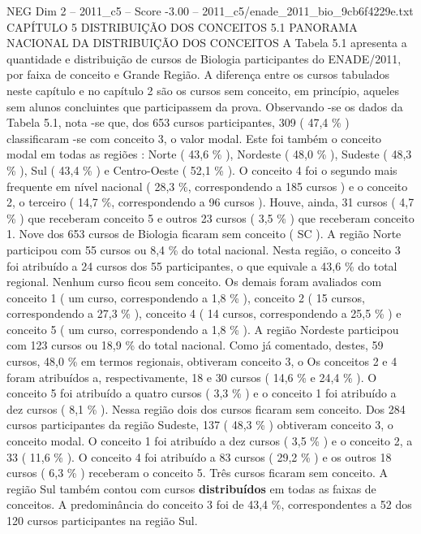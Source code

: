 \begin{textsample}{NEG Dim 2 – 2011\_c5 – Score -3.00 – 2011\_c5/enade\_2011\_bio\_9cb6f4229e.txt}  \label{ex:f2_neg_086}
CAPÍTULO 5 DISTRIBUIÇÃO DOS CONCEITOS 5.1 PANORAMA NACIONAL DA DISTRIBUIÇÃO DOS CONCEITOS A Tabela 5.1 apresenta a quantidade e distribuição de cursos de Biologia participantes do ENADE/2011, por faixa de conceito e Grande Região.
A diferença entre os cursos tabulados neste capítulo e no capítulo 2 são os cursos sem conceito, em princípio, aqueles sem alunos concluintes que participassem da prova.
Observando -se os dados da Tabela 5.1, nota -se que, dos 653 cursos participantes, 309 ( 47,4 \% ) classificaram -se com conceito 3, o valor modal.
Este foi também o conceito modal em todas as regiões : Norte ( 43,6 \% ), Nordeste ( 48,0 \% ), Sudeste ( 48,3 \% ), Sul ( 43,4 \% ) e Centro-Oeste ( 52,1 \% ).
O conceito 4 foi o segundo mais frequente em nível nacional ( 28,3 \%, correspondendo a 185 cursos ) e o conceito 2, o terceiro ( 14,7 \%, correspondendo a 96 cursos ).
Houve, ainda, 31 cursos ( 4,7 \% ) que receberam conceito 5 e outros 23 cursos ( 3,5 \% ) que receberam conceito 1.
Nove dos 653 cursos de Biologia ficaram sem conceito ( SC ).
A região Norte participou com 55 cursos ou 8,4 \% do total nacional.
Nesta região, o conceito 3 foi atribuído a 24 cursos dos 55 participantes, o que equivale a 43,6 \% do total regional.
Nenhum curso ficou sem conceito.
Os demais foram avaliados com conceito 1 ( um curso, correspondendo a 1,8 \% ), conceito 2 ( 15 cursos, correspondendo a 27,3 \% ), conceito 4 ( 14 cursos, correspondendo a 25,5 \% ) e conceito 5 ( um curso, correspondendo a 1,8 \% ).
A região Nordeste participou com 123 cursos ou 18,9 \% do total nacional.
Como já comentado, destes, 59 cursos, 48,0 \% em termos regionais, obtiveram conceito 3, o Os conceitos 2 e 4 foram atribuídos a, respectivamente, 18 e 30 cursos ( 14,6 \% e 24,4 \% ).
O conceito 5 foi atribuído a quatro cursos ( 3,3 \% ) e o conceito 1 foi atribuído a dez cursos ( 8,1 \% ).
Nessa região dois dos cursos ficaram sem conceito.
Dos 284 cursos participantes da região Sudeste, 137 ( 48,3 \% ) obtiveram conceito 3, o conceito modal.
O conceito 1 foi atribuído a dez cursos ( 3,5 \% ) e o conceito 2, a 33 ( 11,6 \% ).
O conceito 4 foi atribuído a 83 cursos ( 29,2 \% ) e os outros 18 cursos ( 6,3 \% ) receberam o conceito 5.
Três cursos ficaram sem conceito.
A região Sul também contou com cursos \textbf{distribuídos} em todas as faixas de conceitos.
A predominância do conceito 3 foi de 43,4 \%, correspondentes a 52 dos 120 cursos participantes na região Sul.

\end{textsample}
